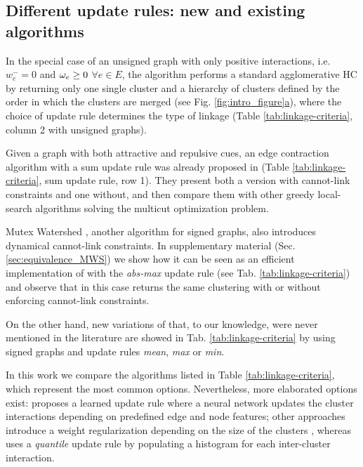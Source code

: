 \subsection{Different update rules: new and existing algorithms} \label{sec:alg_update_rules}

In the special case of an unsigned graph with only positive interactions, i.e. $w_e^-=0$ and $\omega_e \geq 0$ $\forall e\in E$, %
 the algorithm performs a standard agglomerative HC by returning only one single cluster and a hierarchy of clusters defined by the order in which the clusters are merged (see Fig. \hyperref[fig:intro_figure]{\ref*{fig:intro_figure}a}), where the choice of update rule determines the type of linkage (Table \ref{tab:linkage-criteria}, column 2 with unsigned graphs).

Given a graph with both attractive and repulsive cues, an edge contraction algorithm with a sum update rule was already proposed in \cite{levinkov2017comparative,keuper2015efficient} (Table \ref{tab:linkage-criteria}, sum update rule, row 1). They present both a version with cannot-link constraints and one without, and then compare them with other greedy local-search algorithms solving the multicut optimization problem.

Mutex Watershed \cite{wolf2018mutex}, another algorithm for signed graphs, also introduces dynamical cannot-link constraints. In supplementary material (Sec. \ref{sec:equivalence_MWS}) we show how it can be seen as an efficient implementation of \algname{} with the \emph{abs-max} update rule (see Tab. \ref{tab:linkage-criteria}) and observe that in this case \algname{} returns the same clustering with or without enforcing cannot-link constraints.

On the other hand, new variations of \algname{} that, to our knowledge, were never mentioned in the literature are showed in Tab. \ref{tab:linkage-criteria} by using signed graphs and update rules \emph{mean}, \emph{max} or \emph{min}. 

In this work we compare the algorithms listed in Table \ref{tab:linkage-criteria}, which represent the most common options. 
Nevertheless, more elaborated options exist: \cite{nunez2013machine} proposes a learned update rule where a neural network updates the cluster interactions depending on predefined edge and node features; other approaches introduce a weight regularization depending on the size of the clusters \cite{felzenszwalb2004efficient,kardoostsolving}, whereas 
\cite{funke2018large} uses a \emph{quantile} update rule by populating a histogram for each inter-cluster interaction.

